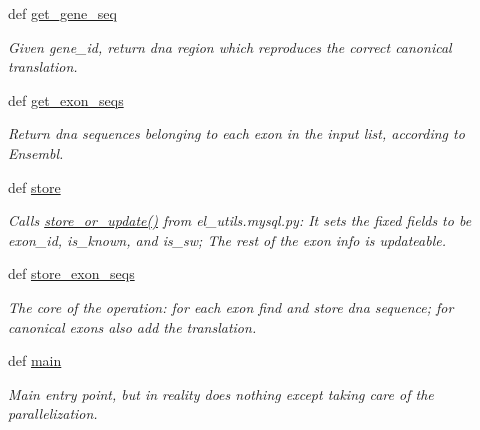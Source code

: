 \begin{DoxyCompactItemize}
def \hyperlink{namespace12__exon__seq__store_a0a266b0c76b80904008c1ac963e9d8d4}{get\-\_\-gene\-\_\-seq}
\begin{DoxyCompactList}\small\item\em Given gene\-\_\-id, return dna region which reproduces the correct canonical translation. \end{DoxyCompactList}\item 
def \hyperlink{namespace12__exon__seq__store_abf226158714d028315bb8905415f81f7}{get\-\_\-exon\-\_\-seqs}
\begin{DoxyCompactList}\small\item\em Return dna sequences belonging to each exon in the input list, according to Ensembl. \end{DoxyCompactList}\item 
def \hyperlink{namespace12__exon__seq__store_a6c9dc3a2f058425a6a487fc8b868d658}{store}
\begin{DoxyCompactList}\small\item\em Calls \hyperlink{namespaceel__utils_1_1mysql_ad1dbce5e2a628225a3aee9f4bb002d4b}{store\-\_\-or\-\_\-update()} from el\-\_\-utils.\-mysql.\-py\-: It sets the fixed fields to be exon\-\_\-id, is\-\_\-known, and is\-\_\-sw; The rest of the exon info is updateable. \end{DoxyCompactList}\item 
def \hyperlink{namespace12__exon__seq__store_a60046448e48836673785b159fbe34282}{store\-\_\-exon\-\_\-seqs}
\begin{DoxyCompactList}\small\item\em The core of the operation\-: for each exon find and store dna sequence; for canonical exons also add the translation. \end{DoxyCompactList}\item 
def \hyperlink{namespace12__exon__seq__store_a8517b3ef4d3826fd5ed3ee3b1bf8d539}{main}
\begin{DoxyCompactList}\small\item\em Main entry point, but in reality does nothing except taking care of the parallelization. \end{DoxyCompactList}\end{DoxyCompactItemize}


